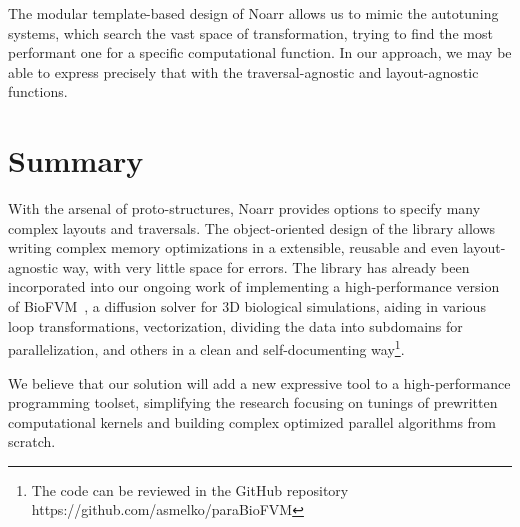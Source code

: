 The modular template-based design of Noarr allows us to mimic the autotuning systems, which search the vast space of transformation, trying to find the most performant one for a specific computational function. In our approach, we may be able to express precisely that with
the traversal-agnostic and layout-agnostic functions.

\section{Summary}

With the arsenal of proto-structures, Noarr provides options to specify many complex layouts and traversals. The object-oriented design of the library allows writing complex memory optimizations in a extensible, reusable and even layout-agnostic way, with very little space for errors. The library has already been incorporated into our ongoing work of implementing a high-performance version of BioFVM~\cite{ghaffarizadeh2016biofvm}, a diffusion solver for 3D biological simulations, aiding in various loop transformations, vectorization, dividing the data into subdomains for parallelization, and others in a clean and self-documenting way\footnote{The code can be reviewed in the GitHub repository https://github.com/asmelko/paraBioFVM}.

We believe that our solution will add a new expressive tool to a high-performance programming toolset, simplifying the research focusing on tunings of prewritten computational kernels and building complex optimized parallel algorithms from scratch.




